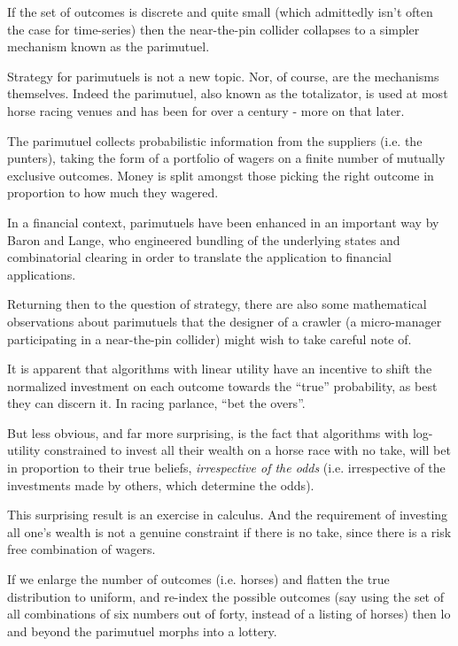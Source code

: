 If the set of outcomes is discrete and quite small (which admittedly isn't often the case for time-series) then the near-the-pin collider collapses to a simpler mechanism known as the parimutuel. 

Strategy for parimutuels is not a new topic. Nor, of course, are the mechanisms themselves. Indeed the parimutuel, also known as the totalizator, is used at most horse racing venues and has been for over a century - more on that later. 


The parimutuel collects probabilistic information from the suppliers (i.e. the punters), taking the form of a portfolio of wagers on a finite number of mutually exclusive outcomes. Money is split amongst those picking the right outcome in proportion to how much they wagered.  


In a financial context, parimutuels have been enhanced in an important way by Baron and Lange, who engineered bundling of the underlying states and combinatorial clearing in order to translate the application to financial applications. 


Returning then to the question of strategy, there are also some mathematical observations about parimutuels that the designer of a crawler (a micro-manager participating in a near-the-pin collider) might wish to take careful note of. 

It is apparent that algorithms with linear utility have an incentive to shift the normalized investment on each outcome towards the ``true'' probability, as best they can discern it. In racing parlance, ``bet the overs''. 

But less obvious, and far more surprising, is the fact that algorithms with log-utility constrained to invest all their wealth on a horse race with no take, will bet in proportion to their true beliefs, {\em irrespective of the odds} (i.e. irrespective of the investments made by others, which determine the odds). 

This surprising result is an exercise in calculus. And the requirement of investing all one's wealth is not a genuine constraint if there is no take, since there is a risk free combination of wagers. 

If we enlarge the number of outcomes (i.e. horses) and flatten the true distribution to uniform, and re-index the possible outcomes (say using the set of all combinations of six numbers out of forty, instead of a listing of horses) then lo and beyond the parimutuel morphs into a lottery. 

